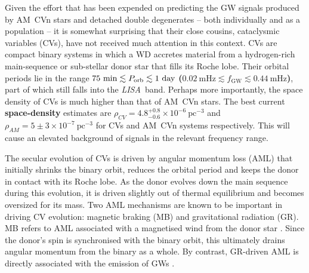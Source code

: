 \documentclass[fleqn,usenatbib]{mnras}
\newcommand{\lisa}{{\it LISA}}
\begin{document}
Given the effort that has been expended on predicting the GW signals produced by AM~CVn stars and detached double degenerates -- both individually and as a population -- it is somewhat surprising that their close cousins, cataclysmic variables (CVs), have not received much attention in this context. CVs are compact binary systems in which a WD accretes material from a hydrogen-rich main-sequence or sub-stellar donor star that fills its Roche lobe. Their orbital periods lie in the range $75~\mathrm{min} \lesssim P_{\rm{orb}} \lesssim 1~\mathrm{day}$ {\bf{($0.02~\mathrm{mHz}\lesssim f_{\mathrm{GW}}\lesssim 0.44~\mathrm{mHz}$)}}, part of which still falls into the \lisa\ band. Perhaps more importantly, the space density of CVs is much higher than that of AM~CVn stars. The best current \textbf{space-density} estimates are $\rho_{CV} = 4.8^{+0.8}_{-0.6} \times 10^{-6}~\mathrm{pc^{-3}}$\citep{pala20} and $\rho_{AM} = 5\pm 3 \times 10^{-7}~\mathrm{pc^{-3}}$\citep{carter13} for CVs and AM~CVn systems respectively. This will cause an elevated background of signals in the relevant frequency range. 

The secular evolution of CVs is driven by angular momentum loss (AML) that initially shrinks the binary orbit, reduces the orbital period and keeps the donor in contact with its Roche lobe. As the donor evolves down the main sequence during this evolution, it is driven slightly out of thermal equilibrium and becomes oversized for its mass. Two AML mechanisms are known to be important in driving CV evolution: magnetic braking (MB) and gravitational radiation (GR). MB refers to AML associated with a magnetised wind from the donor star \citep[e.g.][]{Verbunt1981, Rappaport1983}. Since the donor's spin is synchronised with the binary orbit, this ultimately drains angular momentum from the binary as a whole. By contrast, GR-driven AML is directly associated with the emission of GWs \citep[e.g.][]{Peters1964}. 
\end{document}
